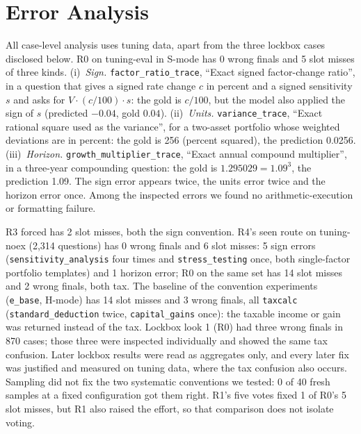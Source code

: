 \documentclass[conference]{IEEEtran}
\newcommand{\id}[1]{\texttt{#1}}
\begin{document}
\section{Error Analysis}\label{sec:errors}
All case-level analysis uses tuning data, apart from the three lockbox cases disclosed below. R0 on tuning-eval in S-mode has 0 wrong finals and 5 slot misses of three kinds. (i)~\emph{Sign.} \id{factor\_ratio\_trace}, ``Exact signed factor-change ratio'', in a question that gives a signed rate change $c$ in percent and a signed sensitivity $s$ and asks for $V\cdot(c/100)\cdot s$: the gold is $c/100$, but the model also applied the sign of $s$ (predicted $-0.04$, gold $0.04$). (ii)~\emph{Units.} \id{variance\_trace}, ``Exact rational square used as the variance'', for a two-asset portfolio whose weighted deviations are in percent: the gold is 256 (percent squared), the prediction 0.0256. (iii)~\emph{Horizon.} \id{growth\_multiplier\_trace}, ``Exact annual compound multiplier'', in a three-year compounding question: the gold is $1.295029=1.09^3$, the prediction 1.09. The sign error appears twice, the units error twice and the horizon error once. Among the inspected errors we found no arithmetic-execution or formatting failure.

R3 forced has 2 slot misses, both the sign convention. R4's seen route on tuning-noex (2,314 questions) has 0 wrong finals and 6 slot misses: 5 sign errors (\id{sensitivity\_analysis} four times and \id{stress\_testing} once, both single-factor portfolio templates) and 1 horizon error; R0 on the same set has 14 slot misses and 2 wrong finals, both tax. The baseline of the convention experiments (\id{e\_base}, H-mode) has 14 slot misses and 3 wrong finals, all \id{taxcalc} (\id{standard\_deduction} twice, \id{capital\_gains} once): the taxable income or gain was returned instead of the tax. Lockbox look 1 (R0) had three wrong finals in 870 cases; those three were inspected individually and showed the same tax confusion. Later lockbox results were read as aggregates only, and every later fix was justified and measured on tuning data, where the tax confusion also occurs. Sampling did not fix the two systematic conventions we tested: 0 of 40 fresh samples at a fixed configuration got them right. R1's five votes fixed 1 of R0's 5 slot misses, but R1 also raised the effort, so that comparison does not isolate voting.
\end{document}
